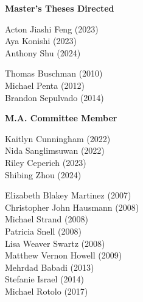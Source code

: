 
\noindent \textbf{Master's Theses Directed}

    \begin{multicols}{2}
    \noindent
    Acton Jiashi Feng (2023) \\
    Aya Konishi (2023)  \\ 	
    Anthony Shu (2024)
\end{multicols}

    \begin{multicols}{2}
    \noindent
    Thomas Buschman (2010) \\
    Michael Penta (2012)  \\ 	
    Brandon Sepulvado (2014)
\end{multicols}
\newpage
\noindent \textbf{M.A. Committee Member}  

\begin{multicols}{2}
    \noindent
    Kaitlyn Cunningham (2022) \\
    Nida Sanglimsuwan (2022) \\
    Riley Ceperich (2023) \\
    Shibing Zhou (2024) 
\end{multicols}

\medskip
{}
\begin{multicols}{2}
    \noindent
    Elizabeth Blakey Martinez (2007) \\
    Christopher John Hausmann (2008) \\
    Michael Strand (2008) \\
    Patricia Snell (2008) \\
    Lisa Weaver Swartz (2008) \\
    Matthew Vernon Howell (2009) \\
    Mehrdad Babadi (2013) \\
    Stefanie Israel (2014) \\
    Michael Rotolo (2017)
\end{multicols}